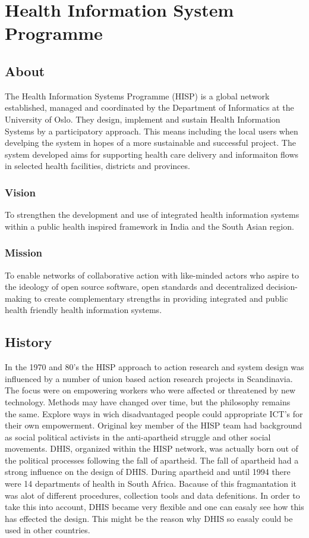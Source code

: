 \section{Health Information System Programme}
\subsection{About}
The Health Information Systems Programme (HISP) is a global network established, managed and coordinated by the Department of Informatics at the University of Oslo.
They design, implement and sustain Health Information Systems by a participatory approach\cite{8}. This means including the local users when develping the system in hopes of a more sustainable and successful project.
The system developed aims for supporting health care delivery and informaiton flows in selected health facilities, districts and provinces.
\subsubsection{Vision}
To strengthen the development and use of integrated health information systems within a public health inspired framework in India and the South Asian region\cite{9}.
\subsubsection{Mission}
To enable networks of collaborative action with like-minded actors who aspire to the ideology of open source software, open standards and decentralized decision-making to create complementary strengths in providing integrated and public health friendly health information systems\cite{9}.
\subsection{History}
In the 1970 and 80's the HISP approach to action research and system design was influenced by a number of union based action research projects in Scandinavia.
The focus were on empowering workers who were affected or threatened by new technology.
Methods may have changed over time, but the philosophy remains the same. Explore ways in wich disadvantaged people could appropriate ICT's for their own empowerment.
Original key member of the HISP team had background as social political activists in the anti-apartheid struggle and other social movements.
DHIS, organized within the HISP network, was actually born out of the political processes following the fall of apartheid\cite{7}. 
The fall of apartheid had a strong influence on the design of DHIS. During apartheid and until 1994 there were 14 departments of health in South Africa.
Bacause of this fragmantation it was alot of different procedures, collection tools and data defenitions. In order to take this into account, DHIS became very flexible and one can easaly see how this has effected the design. 
This might be the reason why DHIS so easaly could be used in other countries.


